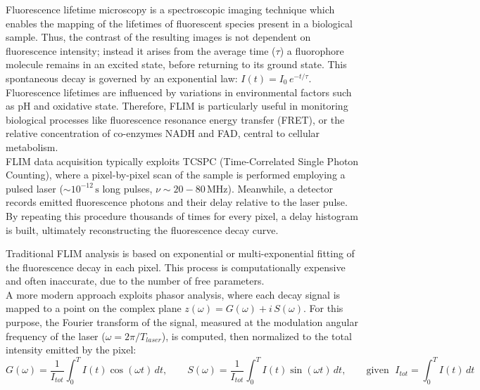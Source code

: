 \documentclass[a4paper, 11pt]{article}
\begin{document}
Fluorescence lifetime microscopy is a spectroscopic imaging technique which enables the mapping of the lifetimes of fluorescent species present in a biological sample. Thus, the contrast of the resulting images is not dependent on fluorescence intensity; instead it arises from the average time ($\tau$) a fluorophore molecule remains in an excited state, before returning to its ground state.
This spontaneous decay is governed by an exponential law: $I(t)=I_0\,e^{-t/\tau}$.\\
Fluorescence lifetimes are influenced by variations in environmental factors such as pH and oxidative state. Therefore, FLIM is particularly useful in monitoring biological processes like fluorescence resonance energy transfer (FRET), or the relative concentration of co-enzymes NADH and FAD, central to cellular metabolism.\\
FLIM data acquisition typically exploits TCSPC (Time-Correlated Single Photon Counting), where a pixel-by-pixel scan of the sample is performed employing a pulsed laser ($\sim10^{-12}\,\text{s}$ long pulses, $\nu\sim 20-80\,\text{MHz}$). Meanwhile, a detector records emitted fluorescence photons and their delay relative to the laser pulse. By repeating this procedure thousands of times for every pixel, a delay histogram is built, ultimately reconstructing the fluorescence decay curve.

Traditional FLIM analysis is based on exponential or multi-exponential fitting of the fluorescence decay in each pixel. This process is computationally expensive and often inaccurate, due to the number of free parameters.\\
A more modern approach exploits phasor analysis, where each decay signal is mapped to a point on the complex plane $z(\omega) = G(\omega) + i\,S(\omega)$. For this purpose, the Fourier transform of the signal, measured at the modulation angular frequency of the laser ($\omega =2\pi/T_{laser}$), is computed, then normalized to the total intensity emitted by the pixel:
\vspace{-5pt}
\[
G(\omega) = \frac{1}{I_{tot}} \int_0^{T} I(t) \cos(\omega t)\,dt, \qquad 
S(\omega) = \frac{1}{I_{tot}} \int_0^{T} I(t) \sin(\omega t)\,dt, \qquad 
\text{given }\;I_{tot} = \int_0^{T} I(t)\,dt
\]
\vspace{-22pt}
\end{document}
